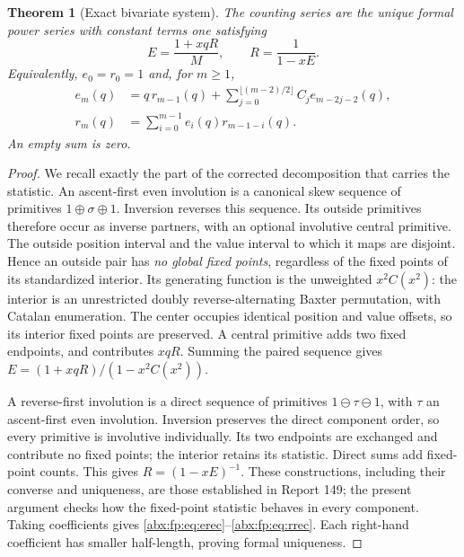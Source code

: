 \documentclass[11pt,letterpaper]{article}
\numberwithin{equation}{section}
\newtheorem{theorem}{Theorem}[section]
\theoremstyle{remark}\newtheorem{remark}[theorem]{Remark}
\begin{document}
\begin{theorem}[Exact bivariate system]\label{abx:fp:thm:exact}
The counting series are the unique formal power series with constant
terms one satisfying
\begin{equation}\label{abx:fp:eq:system}
 E=\frac{1+xqR}{M},\qquad R=\frac1{1-xE}.
\end{equation}
Equivalently, $e_0=r_0=1$ and, for $m\ge1$,
\begin{align}
 e_m(q)&=q\,r_{m-1}(q)+
   \sum_{j=0}^{\lfloor(m-2)/2\rfloor}C_j e_{m-2j-2}(q),\label{abx:fp:eq:erec}\\
 r_m(q)&=\sum_{i=0}^{m-1}e_i(q)r_{m-1-i}(q).\label{abx:fp:eq:rrec}
\end{align}
An empty sum is zero.
\end{theorem}
\begin{proof}
We recall exactly the part of the corrected decomposition that carries
the statistic. An ascent-first even involution is a canonical skew
sequence of primitives $1\oplus\sigma\oplus1$. Inversion reverses
this sequence. Its outside primitives therefore occur as inverse
partners, with an optional involutive central primitive. The outside
position interval and the value interval to which it maps are disjoint.
Hence an outside pair has \emph{no global fixed points}, regardless
of the fixed points of its standardized interior. Its generating
function is the unweighted $x^2C(x^2)$: the interior is an unrestricted
doubly reverse-alternating Baxter permutation, with Catalan enumeration.
The center occupies identical position and value offsets, so its
interior fixed points are preserved. A central primitive adds two fixed
endpoints, and contributes $xqR$. Summing the paired sequence gives
$E=(1+xqR)/(1-x^2C(x^2))$.

A reverse-first involution is a direct sequence of primitives
$1\ominus\tau\ominus1$, with $\tau$ an ascent-first even involution.
Inversion preserves the direct component order, so every primitive is
involutive individually. Its two endpoints are exchanged and contribute
no fixed points; the interior retains its statistic. Direct sums add
fixed-point counts. This gives $R=(1-xE)^{-1}$. These constructions,
including their converse and uniqueness, are those established in
Report 149; the present argument checks how the fixed-point statistic
behaves in every component. Taking coefficients gives
\eqref{abx:fp:eq:erec}--\eqref{abx:fp:eq:rrec}. Each right-hand coefficient has
smaller half-length, proving formal uniqueness.
\end{proof}
\end{document}
